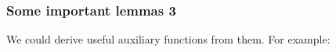 \documentclass[12pt, mathserif,handout]{beamer}
\begin{document}
\begin{frame}

\frametitle{Some important lemmas 3}

We could derive useful auxiliary functions from them. For example:

\begin{code}\>\<%
\\
\> \AgdaSymbol{:} \AgdaSymbol{\{}  \AgdaSymbol{:} \AgdaSymbol{\}}\<%
\\
\>[8]\<[9]%
\>[9]\AgdaSymbol{\{} \AgdaSymbol{:}  \AgdaSymbol{\}\{} \AgdaSymbol{:}   \AgdaSymbol{\}}\<%
\\
\>[8]\<[9]%
\>[9]\AgdaSymbol{(} \AgdaSymbol{:}  \AgdaSymbol{)} \<[20]%
\>[20]\<%
\\
\>[8]\<[9]%
\>[9]  \AgdaSymbol{(} \AgdaFunction{[}  \AgdaFunction{]T}  \AgdaSymbol{)}   \AgdaSymbol{(} \AgdaFunction{[}    \AgdaFunction{]T}\AgdaSymbol{)}\<%
\\
\>   \AgdaSymbol{=}    \<%
\\
\>\<\end{code}


\end{frame}
\end{document}
